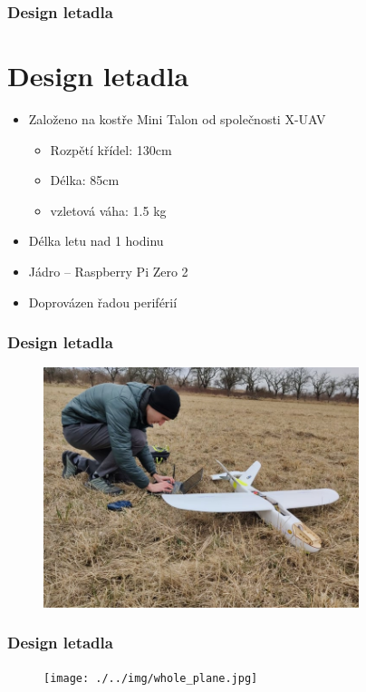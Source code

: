 \documentclass[aspectratio=43]{beamer}
\begin{document}
\begin{frame}[fragile]
	\frametitle{Design letadla}
	\section{Design letadla}
	\begin{itemize}
		\item Založeno na kostře Mini Talon od společnosti X-UAV
			\begin{itemize}
				\item Rozpětí křídel: 130cm
				\item Délka: 85cm
				\item vzletová váha: 1.5 kg
			\end{itemize}
		\item Délka letu nad 1 hodinu
		\item Jádro -- Raspberry Pi Zero 2
		\item Doprovázen řadou periférií
	\end{itemize}
\end{frame}

\begin{frame}[fragile]
	\frametitle{Design letadla}
	\begin{figure}[h]
		\centering
		\includegraphics[height=7cm]{./../img/photo1.jpg}
	\end{figure}
\end{frame}

\begin{frame}[fragile]
	\frametitle{Design letadla}
	\begin{figure}[h]
		\centering
		\texttt{[image: ./../img/whole\_plane.jpg]}
	\end{figure}
\end{frame}
\end{document}
